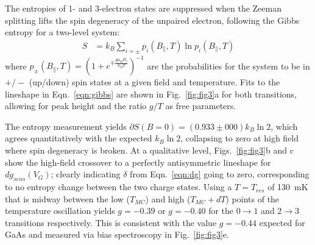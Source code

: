 \documentclass[twocolumn,showpacs,preprintnumbers,amsmath,amssymb,pra,aps,superscriptaddress]{revtex4-1}
\begin{document}
The entropies of 1- and 3-electron states are suppressed when the Zeeman splitting lifts the spin degeneracy of the unpaired electron, following the Gibbs entropy for a two-level system:
%
\begin{align}
\label{eqn:gibbs}
        S &= k_B \sum_{i=\pm} p_{i}(B_\parallel, T) \ln{ p_{i}(B_\parallel,T) }
\end{align}
%
where $p_{\pm}(B_\parallel, T) = (1+ e^{\mp \frac{g\mu_B B_{\parallel}}{k_B T}})^{-1}$ are the probabilities for the system to be in $+/-$ (up/down) spin states at a given field and temperature. Fits to the lineshape in Eqn.~\ref{eqn:gibbs} are shown in Fig.~\ref{fig:fig3}a for both transitions, allowing for peak height and the ratio $g/T$ as free parameters.

The entropy measurement yields $\partial S(B=0) = (0.933 \pm 000) k_B \ln{2}$, which agrees quantitatively with the expected $k_{B} \ln{2}$, collapsing to zero at high field where spin degeneracy is broken.  At a qualitative level, Figs.~\ref{fig:fig3}b and c show the high-field crossover to a perfectly antisymmetric lineshape for $dg_{sens}(V_G)$; clearly indicating $\delta$ from Eqn.~\ref{eqn:dg} going to zero, corresponding to no entropy change between the two charge states. Using a $T=T_{res}$ of \SI{130}{\milli\kelvin} that is midway between the low ($T_{MC}$) and high ($T_{MC}+dT$) points of the temperature oscillation yields $g=-0.39$ or $g=-0.40$ for the $0\rightarrow 1$ and $2\rightarrow 3$ transitions respectively. This is consistent with the value $g=-0.44$ expected for GaAs and measured via bias spectroscopy in Fig.~\ref{fig:fig3}e.
\end{document}
